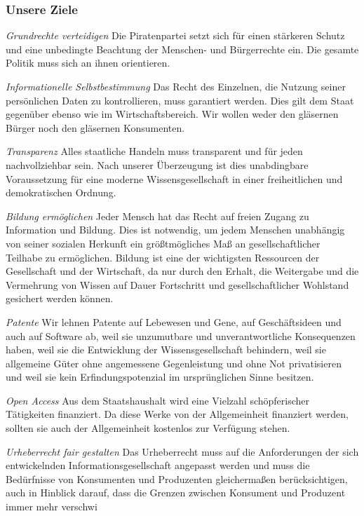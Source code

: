 \subsubsection{Unsere Ziele}
\abstimmung
\textit{Grundrechte verteidigen}
Die Piratenpartei setzt sich für einen stärkeren Schutz und eine unbedingte Beachtung der Menschen- und Bürgerrechte ein. Die gesamte Politik muss sich an ihnen orientieren. 

\textit{Informationelle Selbstbestimmung}
Das Recht des Einzelnen, die Nutzung seiner persönlichen Daten zu kontrollieren, muss garantiert werden. Dies gilt dem Staat gegenüber ebenso wie im Wirtschaftsbereich. Wir wollen weder den gläsernen Bürger noch den gläsernen Konsumenten.

\textit{Transparenz}
Alles staatliche Handeln muss transparent und für jeden nachvollziehbar sein. Nach unserer Überzeugung ist dies unabdingbare Voraussetzung für eine moderne Wissensgesellschaft in einer freiheitlichen und demokratischen Ordnung.

\textit{Bildung ermöglichen}
Jeder Mensch hat das Recht auf freien Zugang zu Information und Bildung. Dies ist notwendig, um jedem Menschen unabhängig von seiner sozialen Herkunft ein größtmögliches Maß an gesellschaftlicher Teilhabe zu ermöglichen. Bildung ist eine der wichtigsten Ressourcen der Gesellschaft und der Wirtschaft, da nur durch den Erhalt, die Weitergabe und die Vermehrung von Wissen auf Dauer Fortschritt und gesellschaftlicher Wohlstand gesichert werden können.

\textit{Patente}
Wir lehnen Patente auf Lebewesen und Gene, auf Geschäftsideen und auch auf Software ab, weil sie unzumutbare und unverantwortliche Konsequenzen haben, weil sie die Entwicklung der Wissensgesellschaft behindern, weil sie allgemeine Güter ohne angemessene Gegenleistung und ohne Not privatisieren und weil sie kein Erfindungspotenzial im ursprünglichen Sinne besitzen.

\textit{Open Access}
Aus dem Staatshaushalt wird eine Vielzahl schöpferischer Tätigkeiten finanziert. Da diese Werke von der Allgemeinheit finanziert werden, sollten sie auch der Allgemeinheit kostenlos zur Verfügung stehen.

\textit{Urheberrecht fair gestalten}
Das Urheberrecht muss auf die Anforderungen der sich entwickelnden Informationsgesellschaft angepasst werden und muss die Bedürfnisse von Konsumenten und Produzenten gleichermaßen berücksichtigen, auch in Hinblick darauf, dass die Grenzen zwischen Konsument und Produzent immer mehr verschwi

